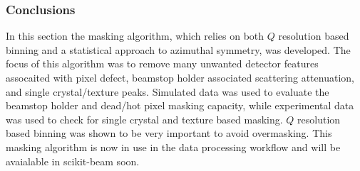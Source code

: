 \subsubsection{Conclusions}
In this section the masking algorithm, which relies on both $Q$ resolution based binning and a statistical approach to azimuthal symmetry, was developed.
The focus of this algorithm was to remove many unwanted detector features assocaited with pixel defect, beamstop holder associated scattering attenuation, and single crystal/texture peaks.
Simulated data was used to evaluate the beamstop holder and dead/hot pixel masking capacity, while experimental data was used to check for single crystal and texture based masking.
$Q$ resolution based binning was shown to be very important to avoid overmasking.
This masking algorithm is now in use in the data processing workflow and will be avaialable in scikit-beam soon.
